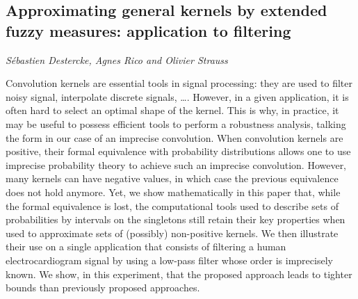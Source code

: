 \documentclass[../booklet.tex]{subfiles}
\begin{document}
\subsection[Approximating general kernels by extended fuzzy measures: application to filtering. {\it Sébastien Destercke, Agnes Rico and Olivier Strauss}]{Approximating general kernels by extended fuzzy measures: application to filtering}
  

\begin{center}
  {\it Sébastien Destercke, Agnes Rico and Olivier Strauss}
\end{center}

\vskip 0.8cm


Convolution kernels are essential tools in signal processing: they are used to filter noisy signal, interpolate discrete signals, \ldots. However, in a given application, it is often hard to select an optimal shape of the kernel. This is why, in practice, it may be useful to possess efficient tools to perform a robustness analysis, talking the form in our case of an imprecise convolution. When convolution kernels are positive, their formal equivalence with probability distributions allows one to use imprecise probability theory to achieve such an imprecise convolution. However, many kernels can have negative values, in which case the previous equivalence does not hold anymore. Yet, we show mathematically in this paper that, while the formal equivalence is lost, the computational tools used to describe sets of probabilities by intervals on the singletons still retain their key properties when used to approximate sets of (possibly) non-positive kernels. We then illustrate their use on a single application that consists of filtering a human electrocardiogram signal by using a low-pass filter whose order is imprecisely known. We show, in this experiment, that the proposed approach leads to tighter bounds than previously proposed approaches.
\end{document}
